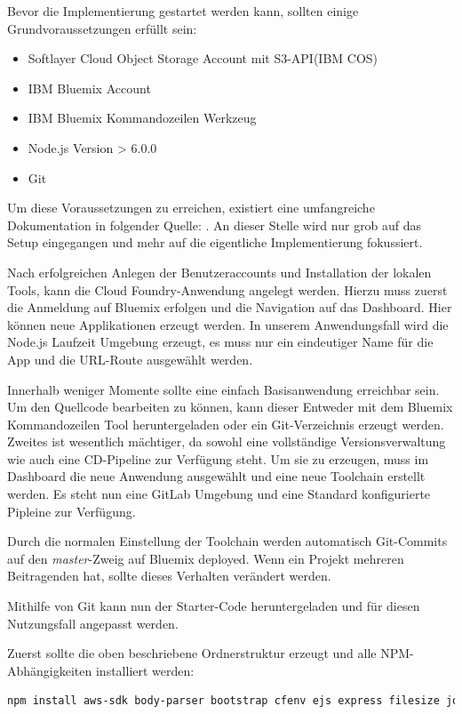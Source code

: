 Bevor die Implementierung gestartet werden kann, sollten einige Grundvoraussetzungen erfüllt sein:

\begin{itemize}
	\item Softlayer Cloud Object Storage Account mit S3-API(IBM COS)
	\item IBM Bluemix Account
	\item IBM Bluemix Kommandozeilen Werkzeug
	\item Node.js Version > 6.0.0
	\item \gls{Git}
\end{itemize}

Um diese Voraussetzungen zu erreichen, existiert eine umfangreiche Dokumentation in folgender Quelle: \cite[S. 129]{Rios.2017}. An dieser Stelle wird nur grob auf das Setup eingegangen und mehr auf die eigentliche Implementierung fokussiert.

Nach erfolgreichen Anlegen der Benutzeraccounts und Installation der lokalen Tools, kann die Cloud Foundry-Anwendung angelegt werden. Hierzu muss zuerst die Anmeldung auf Bluemix erfolgen und die Navigation auf das Dashboard. Hier können neue Applikationen erzeugt werden. In unserem Anwendungsfall wird die Node.js Laufzeit Umgebung erzeugt, es muss nur ein eindeutiger Name für die App und die URL-Route ausgewählt werden.

Innerhalb weniger Momente sollte eine einfach Basisanwendung erreichbar sein. Um den Quellcode bearbeiten zu können, kann dieser Entweder mit dem Bluemix Kommandozeilen Tool heruntergeladen oder ein Git-Verzeichnis erzeugt werden. Zweites ist wesentlich mächtiger, da sowohl eine vollständige Versionsverwaltung wie auch eine \ac{CD}-Pipeline zur Verfügung steht. Um sie zu erzeugen, muss im Dashboard die neue Anwendung ausgewählt und eine neue Toolchain erstellt werden. Es steht nun eine GitLab Umgebung und eine Standard konfigurierte Pipleine zur Verfügung.

Durch die normalen Einstellung der Toolchain werden automatisch Git-Commits auf den \textit{master}-Zweig auf Bluemix deployed. Wenn ein Projekt mehreren Beitragenden hat, sollte dieses Verhalten verändert werden.

Mithilfe von \gls{Git} kann nun der Starter-Code heruntergeladen und für diesen Nutzungsfall angepasst werden.

Zuerst sollte die oben beschriebene Ordnerstruktur erzeugt und alle NPM-Abhängigkeiten installiert werden:

\begin{lstlisting}[language=bash, caption=Paket Installation und package.json erzeugung]
npm install aws-sdk body-parser bootstrap cfenv ejs express filesize jquery moment morgan multer promise toastr watson-developer-cloud --save
\end{lstlisting}

